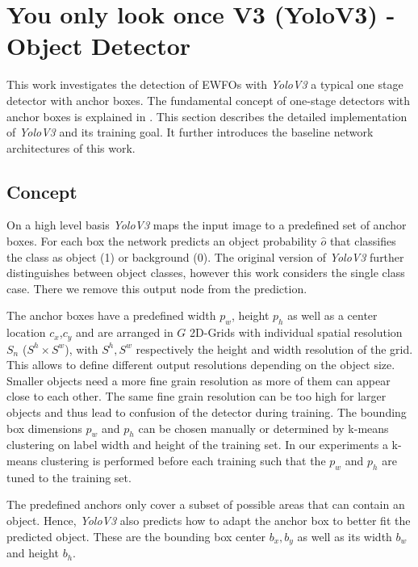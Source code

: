 \section{You only look once V3 (YoloV3) - Object Detector}\label{sec:detection}


This work investigates the detection of \acp{EWFO} with \textit{YoloV3} a typical one stage detector with anchor boxes. The fundamental concept of one-stage detectors with anchor boxes is explained in . This section describes the detailed implementation of \textit{YoloV3} and its training goal. It further introduces the baseline network architectures of this work.

\subsection{Concept}


On a high level basis \textit{YoloV3} maps the input image to a predefined set of anchor boxes. For each box the network predicts an object probability $\hat o$ that classifies the class as object (1) or background (0). The original version of \textit{YoloV3} further distinguishes between object classes, however this work considers the single class case. There we remove this output node from the prediction. 

The anchor boxes have a predefined width $p_w$, height $p_h$ as well as a center location $c_x$,$c_y$ and are arranged in $G$ 2D-Grids with individual spatial resolution $S_n$ ($S^h\times S^w$), with $S^h, S^w$ respectively the height and width resolution of the grid. This allows to define different output resolutions depending on the object size. Smaller objects need a more fine grain resolution as more of them can appear close to each other. The same fine grain resolution can be too high for larger objects and thus lead to confusion of the detector during training. The bounding box dimensions $p_w$ and $p_h$ can be chosen manually or determined by k-means clustering on label width and height of the training set. In our experiments a k-means clustering is performed before each training such that the $p_w$ and $p_h$ are tuned to the training set.

The predefined anchors only cover a subset of possible areas that can contain an object. Hence, \textit{YoloV3} also predicts how to adapt the anchor box to better fit the predicted object. These are the bounding box center $b_x,b_y$ as well as its width $b_w$ and height $b_h$. 

